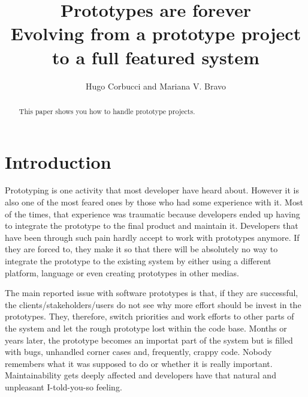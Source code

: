 \documentclass[lnbip]{svmultln}
\begin{document}
%
\mainmatter              %
%
\title{Prototypes are forever\\
  Evolving from a prototype project to a full featured system}
%
%
\author{Hugo Corbucci and Mariana V. Bravo }
%
%
%

\maketitle              %

\begin{abstract}        %

This paper shows you how to handle prototype projects.

\end{abstract}
%
\section{Introduction}

Prototyping is one activity that most developer have heard
about. However it is also one of the most feared ones by those who had
some experience with it. Most of the times, that experience was
traumatic because developers ended up having to integrate the
prototype to the final product and maintain it. Developers that have
been through such pain hardly accept to work with prototypes
anymore. If they are forced to, they make it so that there will be
absolutely no way to integrate the prototype to the existing system by
either using a different platform, language or even creating
prototypes in other medias.

The main reported issue with software prototypes is that, if they are
successful, the clients/stakeholders/users do not see why more effort
should be invest in the prototypes. They, therefore, switch priorities
and work efforts to other parts of the system and let the rough
prototype lost within the code base. Months or years later, the prototype
becomes an importat part of the system but is filled with bugs,
unhandled corner cases and, frequently, crappy code. Nobody
remembers what it was supposed to do or whether it is really
important. Maintainability gets deeply affected and developers have
that natural and unpleasant I-told-you-so feeling.
\end{document}
